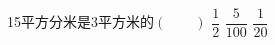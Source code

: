 15平方分米是3平方米的\hfill$\left(\qquad\right)$
   {$\dfrac {1}{2}$}
{$\dfrac {5}{100}$}  {$\dfrac {1}{20}$}